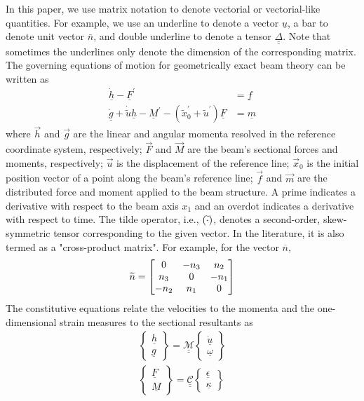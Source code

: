 In this paper, we use matrix notation to denote vectorial or vectorial-like
quantities. For example, we use an underline to denote a vector
$\underline{u}$, a bar to denote unit vector $\bar{n}$, and double underline
to denote a tensor $\underline{\underline{\Delta}}$. Note that sometimes the
underlines only denote the dimension of the corresponding matrix. The
governing equations of motion for geometrically exact beam theory can be written
as\cite{Bauchau:2010}
\begin{align}
	\label{GovernGEBT-1}
	\dot{\underline{h}} - \underline{F}^\prime &= \underline{f} \\
	\label{GovernGEBT-2}
	\dot{\underline{g}} + \dot{\tilde{u}} \underline{h} - \underline{M}^\prime - (\tilde{x}_0^\prime + \tilde{u}^\prime) \underline{F} &= \underline{m}
\end{align}
where $\vec{h}$ and $\vec{g}$ are the linear and angular momenta resolved in
the reference coordinate system, respectively; $\vec{F}$ and $\vec{M}$ are
the beam's sectional forces and moments, respectively; $\vec{u}$ is the 
displacement of the reference line; $\vec{x}_0$ is the initial position vector of a
point along the beam's reference line; $\vec{f}$ and $\vec{m}$ are the
distributed force and moment applied to the beam structure.  
A prime 
indicates a derivative with respect to the beam axis
$x_1$ and an overdot indicates a derivative with respect to time. The
tilde operator,  i.e., $(\widetilde{\cdot})$, denotes a second-order, skew-symmetric
tensor corresponding to the given vector. In the literature, it is also
termed as a "cross-product matrix". For example, for the vector
$\overline{n}$,
\[
	\widetilde{n} = 
	     		\begin{bmatrix}
			0 & -n_3 & n_2 \\
			n_3 & 0 & -n_1 \\
			-n_2 & n_1 & 0\\
			\end{bmatrix}	
\]
The constitutive equations relate the velocities to the momenta and the one-dimensional strain measures to the sectional resultants as
\begin{align}
	\label{ConstitutiveMass}
	\begin{Bmatrix}
	\underline{h} \\
	\underline{g}
	\end{Bmatrix}
	= \underline{\underline{\mathcal{M}}} \begin{Bmatrix}
	\dot{\underline{u}} \\
	\underline{\omega}
	\end{Bmatrix} \\
	\label{ConstitutiveStiff}
	\begin{Bmatrix}
	\underline{F} \\
	\underline{M}
	\end{Bmatrix}
	= \underline{\underline{\mathcal{C}}} \begin{Bmatrix}
	\underline{\epsilon} \\
	\underline{\kappa}
	\end{Bmatrix}
\end{align}
